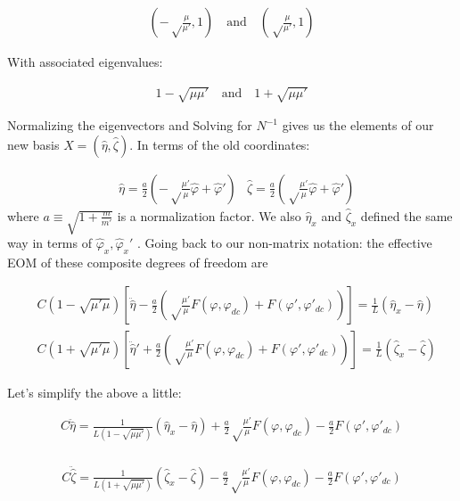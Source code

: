\documentclass[paper=a4, twocolumn, fontsize=10pt]{article} %
\numberwithin{equation}{section} %
\numberwithin{figure}{section} %
\numberwithin{table}{section} %
\def \df#1{\hat{#1}}
\def \dl#1{#1}
\begin{document}
\begin{align} \left(-\sqrt\frac{\mu}{\mu'}, 1\right) \quad \text{and} \quad \left(\sqrt\frac{\mu}{\mu'}, 1\right) \end{align}
 
 With associated eigenvalues:
 
 \begin{align} 1-\sqrt{\mu\mu'} \quad \text{and} \quad 1+\sqrt{\mu\mu'} \end{align} 
 
 Normalizing the eigenvectors and Solving for $N^{-1}$ gives us the elements of our new basis $X = (\df\eta, \df\zeta)$. In terms of the old coordinates:
 
 \begin{align}
 &\df\eta = \frac{a}{2} \left( - \sqrt\frac{\mu'}{\mu} \df\varphi + \df\varphi' \right)
 &\df\zeta = \frac{a}{2} \left( \sqrt\frac{\mu'}{\mu} \df\varphi + \df\varphi' \right)
 \end{align}
where $a \equiv \sqrt{1+\frac{m}{m'}} $ is a normalization factor. We also $\dl\df\eta_x$ and $\df\zeta_x$ defined the same way in terms of $\df\varphi_x, \df\varphi_x'$  . Going back to our non-matrix notation: the effective EOM of these composite degrees of freedom are

\begin{align}
    &C(1-\sqrt{\mu'\mu}) \left[ \ddot{\df\eta} - \frac{a}{2}\left(  \sqrt\frac{\mu'}{\mu}  F(\dl\varphi, \dl\varphi_{dc}) + F(\dl\varphi', \dl\varphi'_{dc})\right)\right] = \frac{1}{L} (\df\eta_x-\df\eta) \\ 
    &C(1+\sqrt{\mu'\mu})\left[  \ddot{\df\eta}' + \frac{a}{2}\left(  \sqrt\frac{\mu'}{\mu}  F(\dl\varphi, \dl\varphi_{dc}) + F(\dl\varphi', \dl\varphi'_{dc})\right)\right] = \frac{1}{L} (\df\zeta_x-\df\zeta) 
\end{align}


Let's simplify the above a little:

\begin{multline}
    C \ddot{\df\eta} = \frac{1}{L(1-\sqrt{\mu\mu'})} (\df\eta_x-\df\eta) + \frac{a}{2}  \sqrt\frac{\mu'}{\mu} F(\dl\varphi, \dl\varphi_{dc}) - \frac{a}{2} F(\dl\varphi', \dl\varphi'_{dc})
\end{multline}
    \\
\begin{multline}
    C \ddot{\df\zeta} = \frac{1}{L(1+\sqrt{\mu\mu'})} (\df\zeta_x-\df\zeta) - \frac{a}{2}  \sqrt\frac{\mu'}{\mu} F(\dl\varphi, \dl\varphi_{dc}) - \frac{a}{2} F(\dl\varphi', \dl\varphi'_{dc})
\end{multline}
\end{document}
